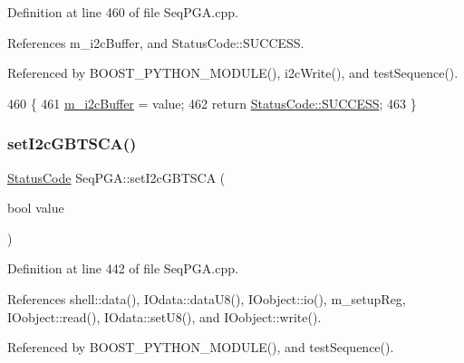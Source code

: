 Definition at line 460 of file Seq\+P\+G\+A.\+cpp.



References m\+\_\+i2c\+Buffer, and Status\+Code\+::\+S\+U\+C\+C\+E\+SS.



Referenced by B\+O\+O\+S\+T\+\_\+\+P\+Y\+T\+H\+O\+N\+\_\+\+M\+O\+D\+U\+L\+E(), i2c\+Write(), and test\+Sequence().


\begin{DoxyCode}
460                                                         \{
461   \hyperlink{classSeqPGA_afcef519379e9c6ba624ba58a4eac79f1}{m\_i2cBuffer} = value;
462   \textcolor{keywordflow}{return} \hyperlink{classStatusCode_a6f565cbeadc76d14c72f047e5e85eb4badd0da38d3ba0d922efd1f4619bc37ad8}{StatusCode::SUCCESS};
463 \}
\end{DoxyCode}
\mbox{\label{classSeqPGA_aef7911620b07d8aeef2a9ec95fa58ca4}} 
\subsubsection{\texorpdfstring{set\+I2c\+G\+B\+T\+S\+C\+A()}{setI2cGBTSCA()}}
{\footnotesize\ttfamily \hyperlink{classStatusCode}{Status\+Code} Seq\+P\+G\+A\+::set\+I2c\+G\+B\+T\+S\+CA (\begin{DoxyParamCaption}\item[{bool}]{value }\end{DoxyParamCaption})}



Definition at line 442 of file Seq\+P\+G\+A.\+cpp.



References shell\+::data(), I\+Odata\+::data\+U8(), I\+Oobject\+::io(), m\+\_\+setup\+Reg, I\+Oobject\+::read(), I\+Odata\+::set\+U8(), and I\+Oobject\+::write().



Referenced by B\+O\+O\+S\+T\+\_\+\+P\+Y\+T\+H\+O\+N\+\_\+\+M\+O\+D\+U\+L\+E(), and test\+Sequence().


